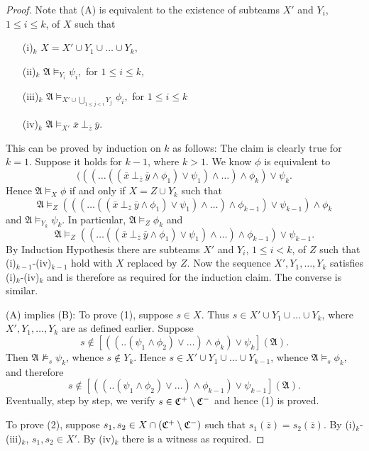 \documentclass{article}
\theoremstyle{plain}
\theoremstyle{definition}
\newcommand{\mA}{{\mathfrak A}}
\newcommand{\ma}{{\mathfrak A}}
\newcommand{\tu}[1]{\overline{#1}}
\newcommand{\indep}[3]{{#1}\ \bot_{#2}\ {#3}}
\begin{document}
\begin{proof} Note that (A) is equivalent to the existence of subteams $X'$ and $Y_i$, $1\le i\le k$, of $X$ such that 

\begin{enumerate}
\item[(i)$_{k}$] $X=X'\cup Y_1\cup\ldots\cup Y_k,$
\item[(ii)$_{k}$] $\mA\models_{Y_i}\psi_i,$ for $1\le i\le k$,
\item[(iii)$_{k}$] $\mA\models_{X'\cup \bigcup_{1\le j <i} Y_{j}}\phi_{i},$ for $1\le i\le k$
\item [(iv)$_{k}$] $\ma\models_{X'}  \indep {\tu x}{\tu z}{\tu y}$.
\end{enumerate}
This can be proved by induction on $k$ as follows: The claim is clearly true for $k=1$. Suppose it holds for $k-1$, where $k>1$. We know $\phi$ is equivalent to $$ (((\dots ((\indep {\tu x}{\tu z}{\tu y} \wedge \phi_1) \vee \psi_1)\wedge \dots ) \wedge \phi_k) \vee \psi_k.
$$ Hence $\ma\models_X\phi$ if and only if $X=Z\cup Y_k$ such that $$\ma\models_Z (((\dots ((\indep {\tu x}{\tu z}{\tu y} \wedge \phi_1) \vee \psi_1)\wedge \dots ) \wedge \phi_{k-1}) \vee \psi_{k-1})\wedge\phi_k
$$ and $\ma\models_{Y_k}\psi_k$. In particular, $\ma\models_Z\phi_k$ and $$\ma\models_Z ((\dots ((\indep {\tu x}{\tu z}{\tu y} \wedge \phi_1) \vee \psi_1)\wedge \dots ) \wedge \phi_{k-1}) \vee \psi_{k-1}.$$
By Induction Hypothesis there are subteams $X'$ and $Y_i$, $1\le i< k$, of $Z$ such that (i)$_{k-1}$-(iv)$_{k-1}$ hold with $X$ replaced by $Z$.
Now the sequence $X',Y_1,\ldots,Y_k$ satisfies (i)$_{k}$-(iv)$_{k}$ and is therefore as required for the induction claim. The converse is similar.

(A) implies (B): To prove (1), suppose $s\in X$. Thus $s\in X'\cup Y_1\cup\ldots\cup Y_k$, where $X',Y_1,\ldots, Y_k$ are as defined earlier. Suppose  
$$s\notin [((..(\psi_1\wedge \phi_2) \vee \dots ) \wedge \phi_k) \vee \psi_k](\mA).
$$
 Then $\ma\not\models_s\psi_k$, whence $s\notin Y_k$. Hence $s\in X'\cup Y_1\cup\ldots \cup Y_{k-1}$, whence $\ma\models_s\phi_k$, and therefore  $$s\notin [((..(\psi_1\wedge \phi_2) \vee \dots ) \wedge \phi_{k-1}) \vee \psi_{k-1}](\mA).
$$ Eventually, step by step, we verify $s\in \mathfrak{C}^{+}\setminus\mathfrak{C}^{-}$ and hence
 (1) is proved. 
 
 To prove (2), suppose $s_1,s_2\in X\cap(\mathfrak{C}^{+}\setminus \mathfrak{C}^{-})$ such that $s_1(\tu z)=s_2(\tu z)$. By (i)$_{k}$-(iii)$_{k}$, $s_1,s_2\in X'$. By (iv)$_{k}$ there is a witness as required.
 

\end{proof}
\end{document}
